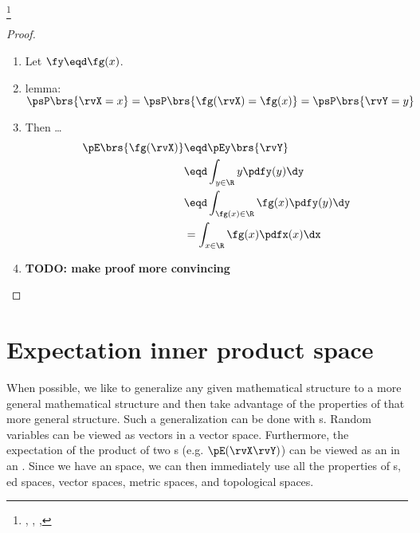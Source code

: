\begin{theorem}
\footnote{
  ,
  ,
  ,
  }
\end{theorem}
\begin{proof}
\begin{enumerate}
  \item Let $\fy\eqd\fg(x)$.
  \item lemma: $\psP\brs{\rvX=x} = \psP\brs{ \fg(\rvX)=\fg(x) } = \psP\brs{ \rvY=y }$
  \item Then \ldots
        \begin{align*}
          \pE\brs{\fg(\rvX)}
            &\eqd \pEy\brs{\rvY}
          \\&\eqd \int_{y\in\R} y \pdfy(y) \dy
          \\&\eqd \int_{\fg(x)\in\R} \fg(x) \pdfy(y) \dy
          \\&=    \int_{x\in\R} \fg(x) \pdfx(x) \dx
        \end{align*}
  \item \textbf{TODO: make proof more convincing}
\end{enumerate}
\end{proof}

\section{Expectation inner product space}
When possible, we like to generalize any given mathematical structure
to a more general mathematical structure and then take advantage of
the properties of that more general structure.
Such a generalization can be done with s.
Random variables can be viewed as vectors in a vector space.
Furthermore, the expectation of the product of two s
(e.g. $\pE(\rvX\rvY)$)
can be viewed as an  in an .
Since we have an  space,
we can then immediately use all the properties of
s, ed spaces, vector spaces, metric spaces,
and topological spaces.


